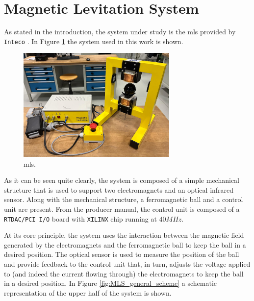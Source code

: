 \section{Magnetic Levitation System}
\label{sec:magnetic_levitation_system}

As stated in the introduction, the system under study is the \acrfull{mls} provided by \texttt{Inteco} \cite{IntecoMLS}.
In Figure \ref{fig:MLS} the system used in this work is shown.

\begin{figure}[H]
    \centering
    \includegraphics[width=0.7\textwidth]{./img/Maglev_from_the_lab.jpeg}
    \caption{\acrlong{mls}.}
    \label{fig:MLS}
\end{figure}

As it can be seen quite clearly, the system is composed of a simple mechanical structure that is used to support two electromagnets and an optical infrared sensor.
Along with the mechanical structure, a ferromagnetic ball and a control unit are present.
From the producer manual, the control unit is composed of a \texttt{RTDAC/PCI I/O} board with \texttt{XILINX} chip running at $40 MHz$.

At its core principle, the system uses the interaction between the magnetic field generated by the electromagnets and the ferromagnetic ball to keep the ball in a desired position.
The optical sensor is used to measure the position of the ball and provide feedback to the control unit that, in turn, adjusts the voltage applied to (and indeed the current flowing through) the electromagnets to keep the ball in a desired position.
In Figure \ref{fig:MLS_general_scheme} a schematic representation of the upper half of the system is shown.

